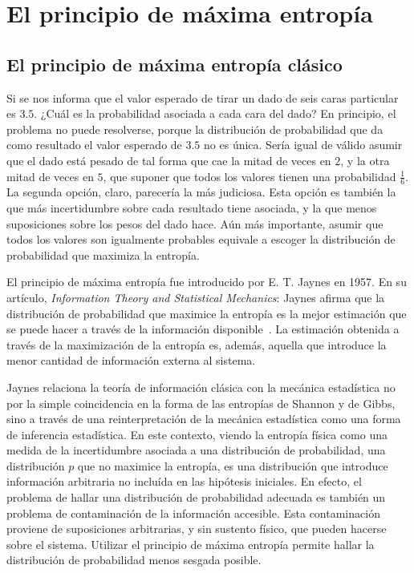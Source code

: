 \section{El principio de máxima entropía}\label{sec:CH1MaxEnt}



\subsection{El principio de máxima entropía clásico}

Si se nos informa que el valor esperado de tirar un dado de seis caras particular es $3.5$. ¿Cuál es la probabilidad asociada a cada cara del dado? En principio, el problema no puede resolverse, porque la distribución de probabilidad que da como resultado el valor esperado de $3.5$ no es única. Sería igual de válido asumir que el dado está pesado de tal forma que cae la mitad de veces en $2$, y la otra mitad de veces en $5$, que suponer que todos los valores tienen una probabilidad $\frac{1}{6}$. La segunda opción, claro, parecería la más judiciosa. Esta opción es también la que más incertidumbre sobre cada resultado tiene asociada, y la que menos suposiciones sobre los pesos del dado hace. Aún más importante, asumir que todos los valores son igualmente probables equivale a escoger la distribución de probabilidad que maximiza la entropía.

El principio de máxima entropía fue introducido por E. T. Jaynes en 1957. En su artículo, \textit{Information Theory and Statistical Mechanics}: Jaynes afirma que la distribución de probabilidad que maximice la entropía es la mejor estimación que se puede hacer a través de la información disponible~\cite{JaynesI}. La estimación obtenida a través de la maximización de la entropía es, además, aquella que introduce la menor cantidad de información externa al sistema.

Jaynes relaciona la teoría de información clásica con la mecánica estadística no por la simple coincidencia en la forma de las entropías de Shannon y de Gibbs, sino a través de una reinterpretación de la mecánica estadística como una forma de inferencia estadística. En este contexto, viendo la entropía física como una medida de la incertidumbre asociada a una distribución de probabilidad, una distribución $p$ que no maximice la entropía, es una distribución que introduce información arbitraria no incluída en las hipótesis iniciales. En efecto, el problema de hallar una distribución de probabilidad adecuada es también un problema de contaminación de la información accesible. Esta contaminación proviene de suposiciones arbitrarias, y sin sustento físico, que pueden hacerse sobre el sistema. Utilizar el principio de máxima entropía permite hallar la distribución de probabilidad menos sesgada posible.

